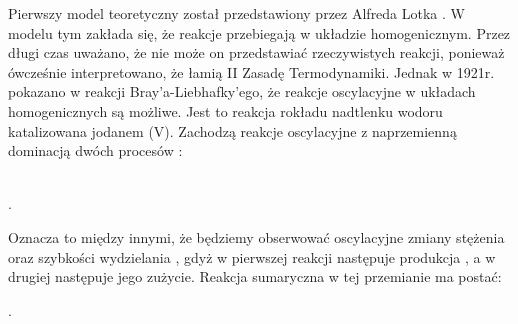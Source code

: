 \documentclass[10pt, a4paper, twoside, onecolumn]{article}
\numberwithin{equation}{section}
\begin{document}
	\par
	Pierwszy model teoretyczny został przedstawiony przez Alfreda Lotka \cite{lotka}. W modelu tym zakłada się, że reakcje przebiegają w układzie homogenicznym. Przez długi czas uważano, że nie może on przedstawiać rzeczywistych reakcji, ponieważ ówcześnie interpretowano, że łamią II Zasadę Termodynamiki. Jednak w 1921r. pokazano w reakcji Bray'a-Liebhafky'ego, że reakcje oscylacyjne w układach homogenicznych są możliwe. Jest to reakcja rokładu nadtlenku wodoru katalizowana jodanem (V). Zachodzą reakcje oscylacyjne z naprzemienną dominacją dwóch procesów \cite{orlik}:
	\begin{center}
		 \\
		.
	\end{center}
	Oznacza to między innymi, że będziemy obserwować oscylacyjne zmiany stężenia  oraz szybkości wydzielania , gdyż w pierwszej reakcji następuje produkcja , a w drugiej następuje jego zużycie. Reakcja sumaryczna w tej przemianie ma postać: 
	\begin{center}
		.
	\end{center}
	
\end{document}

